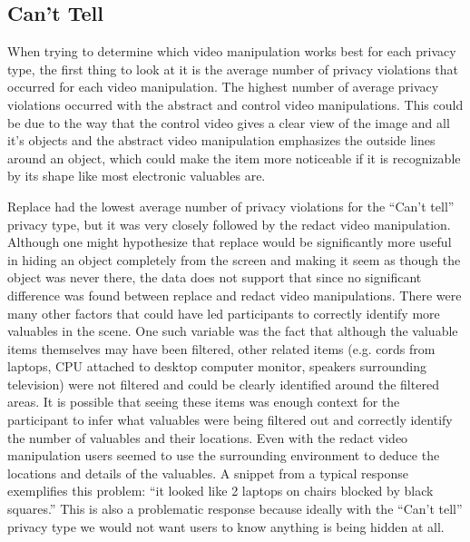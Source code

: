 \documentclass{acm_proc_article-sp}
\begin{document}
\subsection{Can't Tell}
When trying to determine which video manipulation works best for each privacy type, the first thing to look at it is the average number of privacy violations that occurred for each video manipulation. The highest number of average privacy violations occurred with the abstract and control video manipulations. This could be due to the way that the control video gives a clear view of the image and all it's objects and the abstract video manipulation emphasizes the outside lines around an object, which could make the item more noticeable if it is recognizable by its shape like most electronic valuables are.

 Replace had the lowest average number of privacy violations for the ``Can't tell'' privacy type, but it was very closely followed by the redact video manipulation. Although one might hypothesize that replace would be significantly more useful in hiding an object completely from the screen and making it seem as though the object was never there, the data does not support that since no significant difference was found between replace and redact video manipulations. There were many other factors that could have led participants to correctly identify more valuables in the scene. One such variable was the fact that although the valuable items themselves may have been filtered, other related items (e.g. cords from laptops, CPU attached to desktop computer monitor, speakers surrounding television) were not filtered and could be clearly identified around the filtered areas. It is possible that seeing these items was enough context for the participant to infer what valuables were being filtered out and correctly identify the number of valuables and their locations. Even with the redact video manipulation users seemed to use the surrounding environment to deduce the locations and details of the valuables. A snippet from a typical response exemplifies this problem: ``it looked like 2 laptops on chairs blocked by black  squares.'' This is also a problematic response because ideally with the ``Can't tell'' privacy type we would not want users to know anything is being hidden at all. 
\end{document}
